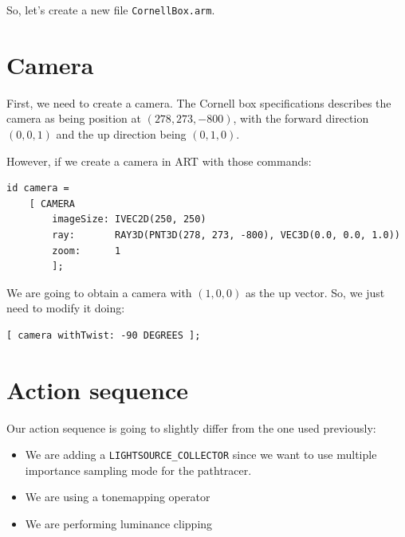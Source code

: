 \documentclass[a4paper,chapterprefix]{scrbook}
\begin{document}
So, let's create a new file \verb?CornellBox.arm?.

\section{Camera}
First, we need to create a camera. The Cornell box specifications describes the camera as being position at $(278, 273, -800)$, with the forward direction $(0, 0, 1)$ and the up direction being $(0, 1, 0)$.

However, if we create a camera in ART with those commands:

\begin{lstlisting}
id camera =
    [ CAMERA
        imageSize: IVEC2D(250, 250)
        ray:       RAY3D(PNT3D(278, 273, -800), VEC3D(0.0, 0.0, 1.0))
        zoom:      1
        ];
\end{lstlisting}

We are going to obtain a camera with $(1, 0, 0)$ as the up vector.
So, we just need to modify it doing:

\begin{lstlisting}
[ camera withTwist: -90 DEGREES ];
\end{lstlisting}

\section{Action sequence}
Our action sequence is going to slightly differ from the one used previously:

\begin{itemize}
	\item We are adding a \verb?LIGHTSOURCE_COLLECTOR? since we want to use multiple importance sampling mode for the pathtracer.
	\item We are using a tonemapping operator
	\item We are performing luminance clipping
\end{itemize}
\end{document}
